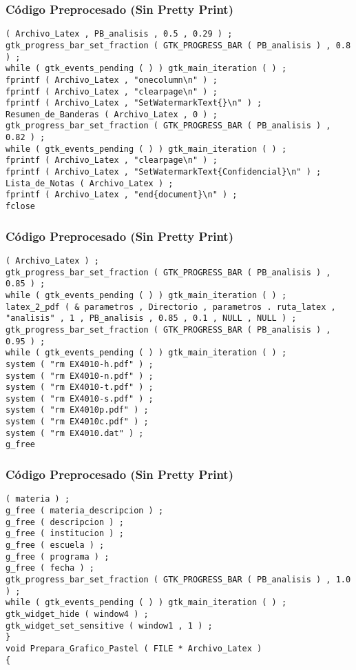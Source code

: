 \documentclass{beamer}
\begin{document}
\begin{frame}[fragile]
\frametitle{C\'odigo Preprocesado (Sin Pretty Print)}
\begin{lstlisting}[style=CStyle]
( Archivo_Latex , PB_analisis , 0.5 , 0.29 ) ; 
gtk_progress_bar_set_fraction ( GTK_PROGRESS_BAR ( PB_analisis ) , 0.8 ) ; 
while ( gtk_events_pending ( ) ) gtk_main_iteration ( ) ; 
fprintf ( Archivo_Latex , "onecolumn\n" ) ; 
fprintf ( Archivo_Latex , "clearpage\n" ) ; 
fprintf ( Archivo_Latex , "SetWatermarkText{}\n" ) ; 
Resumen_de_Banderas ( Archivo_Latex , 0 ) ; 
gtk_progress_bar_set_fraction ( GTK_PROGRESS_BAR ( PB_analisis ) , 0.82 ) ; 
while ( gtk_events_pending ( ) ) gtk_main_iteration ( ) ; 
fprintf ( Archivo_Latex , "clearpage\n" ) ; 
fprintf ( Archivo_Latex , "SetWatermarkText{Confidencial}\n" ) ; 
Lista_de_Notas ( Archivo_Latex ) ; 
fprintf ( Archivo_Latex , "end{document}\n" ) ; 
fclose \end{lstlisting}
\end{frame}
\begin{frame}[fragile]
\frametitle{C\'odigo Preprocesado (Sin Pretty Print)}
\begin{lstlisting}[style=CStyle]
( Archivo_Latex ) ; 
gtk_progress_bar_set_fraction ( GTK_PROGRESS_BAR ( PB_analisis ) , 0.85 ) ; 
while ( gtk_events_pending ( ) ) gtk_main_iteration ( ) ; 
latex_2_pdf ( & parametros , Directorio , parametros . ruta_latex , "analisis" , 1 , PB_analisis , 0.85 , 0.1 , NULL , NULL ) ; 
gtk_progress_bar_set_fraction ( GTK_PROGRESS_BAR ( PB_analisis ) , 0.95 ) ; 
while ( gtk_events_pending ( ) ) gtk_main_iteration ( ) ; 
system ( "rm EX4010-h.pdf" ) ; 
system ( "rm EX4010-n.pdf" ) ; 
system ( "rm EX4010-t.pdf" ) ; 
system ( "rm EX4010-s.pdf" ) ; 
system ( "rm EX4010p.pdf" ) ; 
system ( "rm EX4010c.pdf" ) ; 
system ( "rm EX4010.dat" ) ; 
g_free \end{lstlisting}
\end{frame}
\begin{frame}[fragile]
\frametitle{C\'odigo Preprocesado (Sin Pretty Print)}
\begin{lstlisting}[style=CStyle]
( materia ) ; 
g_free ( materia_descripcion ) ; 
g_free ( descripcion ) ; 
g_free ( institucion ) ; 
g_free ( escuela ) ; 
g_free ( programa ) ; 
g_free ( fecha ) ; 
gtk_progress_bar_set_fraction ( GTK_PROGRESS_BAR ( PB_analisis ) , 1.0 ) ; 
while ( gtk_events_pending ( ) ) gtk_main_iteration ( ) ; 
gtk_widget_hide ( window4 ) ; 
gtk_widget_set_sensitive ( window1 , 1 ) ; 
} 
void Prepara_Grafico_Pastel ( FILE * Archivo_Latex ) 
{ \end{lstlisting}
\end{frame}
\end{document}
